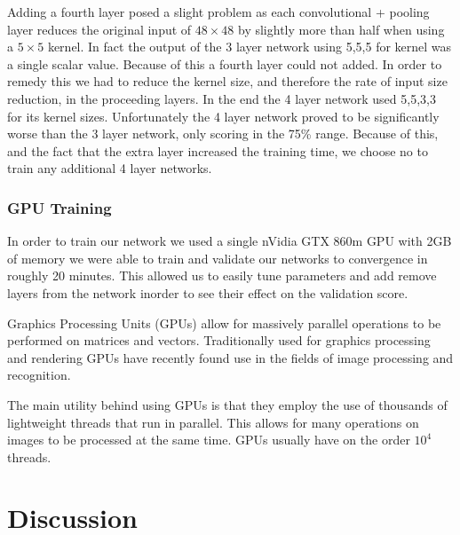 \documentclass[10pt,twocolumn]{article}
\begin{document}
Adding a fourth layer posed a slight problem as each convolutional + pooling layer reduces the original input of $48 \times 48$ by slightly more than half when using a $5 \times 5$ kernel. In fact the output of the 3 layer network using 5,5,5 for kernel was a single scalar value. Because of this a fourth layer could not added. In order to remedy this we had to reduce the kernel size, and therefore the rate of input size reduction, in the proceeding layers. In the end the 4 layer network used 5,5,3,3 for its kernel sizes. Unfortunately the 4 layer network proved to be significantly worse than the 3 layer network, only scoring in the 75\% range. Because of this, and the fact that the extra layer increased the training time, we choose no to train any additional 4 layer networks.
 
\subsubsection{GPU Training}
In order to train our network we used a single nVidia GTX 860m GPU with 2GB of memory we were able to train and validate our networks to convergence in roughly 20 minutes. This allowed us to easily tune parameters and add remove layers from the network inorder to see their effect on the validation score.

Graphics Processing Units (GPUs) allow for massively parallel operations to be performed on matrices and vectors. Traditionally used for graphics processing and rendering GPUs have recently found use in the fields of image processing and recognition. 

The main utility behind using GPUs is that they employ the use of thousands of lightweight threads that run in parallel. This allows for many operations on images to be processed at the same time. GPUs usually have on the order $10^4$ threads.

\section{Discussion}


\end{document}
